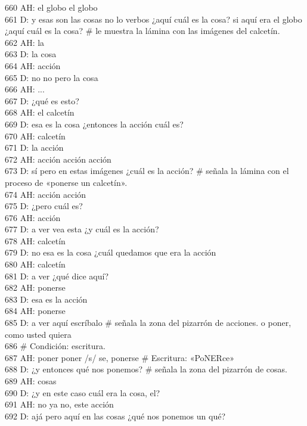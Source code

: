 660 AH: el globo el globo\\
661 D: y esas son las cosas no lo verbos ¿aquí cuál es la cosa? si aquí era el globo ¿aquí cuál es la cosa? \# le muestra la lámina con las imágenes del calcetín.\\
662 AH: la\\
663 D: la cosa\\
664 AH: acción\\
665 D: no no pero la cosa\\
666 AH: ...\\
667 D: ¿qué es esto?\\
668 AH: el calcetín\\
669 D: esa es la cosa ¿entonces la acción cuál es?\\
670 AH: calcetín\\
671 D: la acción\\
672 AH: acción acción acción\\
673 D: sí pero en estas imágenes ¿cuál es la acción? \# señala la lámina con el proceso de «ponerse un calcetín».\\
674 AH: acción acción\\
675 D: ¿pero cuál es?\\
676 AH: acción\\
677 D: a ver vea esta ¿y cuál es la acción?\\
678 AH: calcetín\\
679 D: no esa es la cosa ¿cuál quedamos que era la acción\\
680 AH: calcetín\\
681 D: a ver ¿qué dice aquí?\\
682 AH: ponerse\\
683 D: esa es la acción\\
684 AH: ponerse\\
685 D: a ver aquí escríbalo \# señala la zona del pizarrón de acciones. o poner, como usted quiera\\
686 \# Condición: escritura.\\
687 AH: poner poner /s/ se, ponerse \# Escritura: «PoNERce»\\
688 D: ¿y entonces qué nos ponemos? \# señala la zona del pizarrón de cosas.\\
689 AH: cosas\\
690 D: ¿y en este caso cuál era la cosa, el?\\
691 AH: no ya no, este acción\\
692 D: ajá pero aquí en las cosas ¿qué nos ponemos un qué?\\
